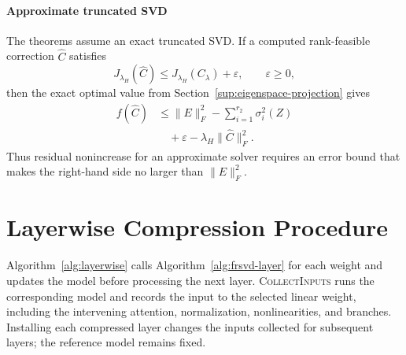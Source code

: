\paragraph{Approximate truncated SVD}
The theorems assume an exact truncated SVD. If a computed rank-feasible correction $\widehat C$ satisfies
\begin{equation}
J_{\lambda_H}(\widehat C)
\le J_{\lambda_H}(C_\lambda)+\varepsilon,
\qquad\varepsilon\ge0,
\end{equation}
then the exact optimal value from Section~\ref{sup:eigenspace-projection} gives
\begin{equation}
\begin{aligned}
f(\widehat C)
&\le\|E\|_F^2-\sum_{i=1}^{r_2}\sigma_i^2(Z) \\
&\quad+\varepsilon-\lambda_H\|\widehat C\|_F^2.
\end{aligned}
\end{equation}
Thus residual nonincrease for an approximate solver requires an error bound that makes the right-hand side no larger than $\|E\|_F^2$.

\section{Layerwise Compression Procedure}\label{app:algorithms}

Algorithm~\ref{alg:layerwise} calls Algorithm~\ref{alg:frsvd-layer} for each weight and updates the model before processing the next layer. \textsc{CollectInputs} runs the corresponding model and records the input to the selected linear weight, including the intervening attention, normalization, nonlinearities, and branches. Installing each compressed layer changes the inputs collected for subsequent layers; the reference model remains fixed.

